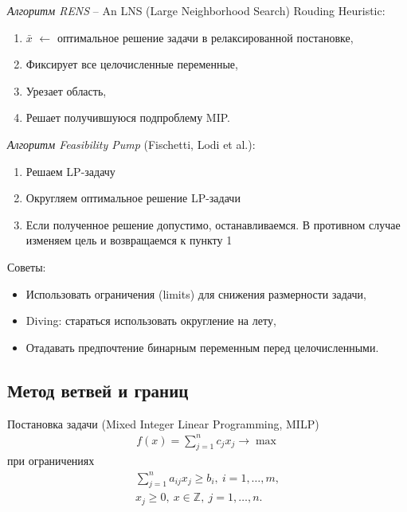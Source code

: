 \documentclass[%
	11pt,
	a4paper,
	utf8,
		]{article}
\begin{document}
\emph{Алгоритм RENS} -- An LNS (Large Neighborhood Search) Rouding Heuristic:
\begin{enumerate}
	\item $ \bar{x} $ $\leftarrow$ оптимальное решение задачи в релаксированной постановке,
	
	\item Фиксирует все целочисленные переменные,
	
	\item Урезает область,
	
	\item Решает получившуюся подпроблему MIP.
\end{enumerate}

\emph{Алгоритм Feasibility Pump} (Fischetti, Lodi et al.):
\begin{enumerate}
	\item Решаем LP-задачу
	
	\item Округляем оптимальное решение LP-задачи
	
	\item Если полученное решение допустимо, останавливаемся. В противном случае изменяем цель и возвращаемся к пункту 1
\end{enumerate}

Советы:
\begin{itemize}
	\item Использовать ограничения (limits) для снижения размерности задачи,
	
	\item Diving: стараться использовать округление на лету,
	
	\item Отадавать предпочтение бинарным переменным перед целочисленными. 
\end{itemize}

\subsection{Метод ветвей и границ}

Постановка задачи (Mixed Integer Linear Programming, MILP)
\begin{align*}
	f(x) = \sum_{j=1}^{n} c_j x_j \rightarrow \max
\end{align*}
при ограничениях
\begin{align*}
	\sum_{j=1}^{n} a_{ij} x_j \geqslant b_i, \ i = 1, \ldots, m,\\
	x_j \geqslant 0, \ x \in \mathbb{Z}, \ j = 1, \ldots, n.
\end{align*}
\end{document}

